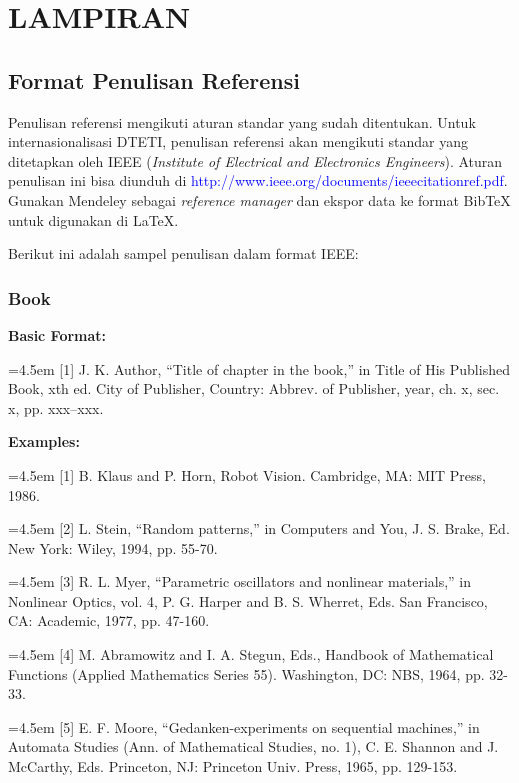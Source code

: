 \chapter*{LAMPIRAN}

\section{Format Penulisan Referensi}

Penulisan referensi mengikuti aturan standar yang sudah ditentukan. Untuk internasionalisasi DTETI, penulisan referensi akan mengikuti standar yang ditetapkan oleh IEEE (\textit{Institute of Electrical and Electronics Engineers}). Aturan penulisan ini bisa diunduh di \textcolor{blue}{http://www.ieee.org/documents/ieeecitationref.pdf}. Gunakan Mendeley sebagai \textit{reference manager} dan ekspor data ke format BibTeX untuk digunakan di LaTeX.

Berikut ini adalah sampel penulisan dalam format IEEE:

\subsection{Book}

\textbf{Basic Format:}

\hangindent=4.5em
[1] J. K. Author, ``Title of chapter in the book,'' in Title of His Published Book, xth ed. City of Publisher, Country: Abbrev. of Publisher, year, ch. x, sec. x, pp. xxx--xxx.

\textbf{Examples:}

\hangindent=4.5em 
[1] B. Klaus and P. Horn, Robot Vision. Cambridge, MA: MIT Press, 1986.

\hangindent=4.5em 
[2] L. Stein, ``Random patterns,'' in Computers and You, J. S. Brake, Ed. New York: Wiley, 1994, pp. 55-70.

\hangindent=4.5em 
[3] R. L. Myer, ``Parametric oscillators and nonlinear materials,'' in Nonlinear Optics, vol. 4, P. G. Harper and B. S. Wherret, Eds. San Francisco, CA: Academic, 1977, pp. 47-160.

\hangindent=4.5em 
[4] M. Abramowitz and I. A. Stegun, Eds., Handbook of Mathematical Functions (Applied Mathematics Series 55). Washington, DC: NBS, 1964, pp. 32-33.

\hangindent=4.5em 
[5] E. F. Moore, ``Gedanken-experiments on sequential machines,'' in Automata Studies (Ann. of Mathematical Studies, no. 1), C. E. Shannon and J. McCarthy, Eds. Princeton, NJ: Princeton Univ. Press, 1965, pp. 129-153.

